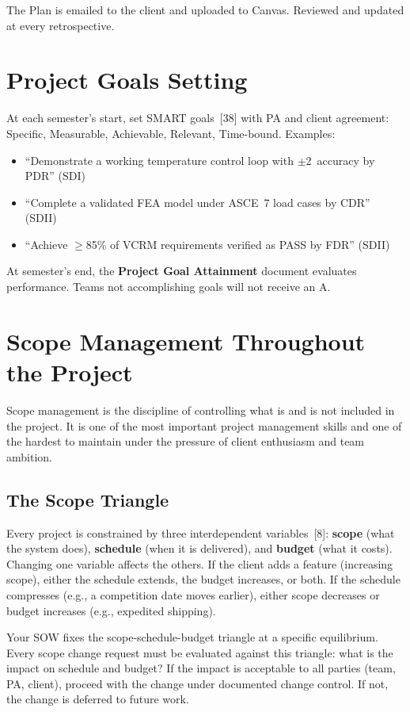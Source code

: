 The Plan is emailed to the client and uploaded to Canvas. Reviewed and updated at every retrospective.

\section{Project Goals Setting}
At each semester's start, set SMART goals~[38] with PA and client agreement: Specific, Measurable, Achievable, Relevant, Time-bound. Examples:
\begin{itemize}[nosep,leftmargin=1.5em]
\item ``Demonstrate a working temperature control loop with $\pm$2\,\degC{} accuracy by PDR'' (SDI)
\item ``Complete a validated FEA model under ASCE~7 load cases by CDR'' (SDII)
\item ``Achieve $\geq$85\% of VCRM requirements verified as PASS by FDR'' (SDII)
\end{itemize}

At semester's end, the \textbf{Project Goal Attainment} document evaluates performance. Teams not accomplishing goals will not receive an A.

\section{Scope Management Throughout the Project}
Scope management is the discipline of controlling what is and is not included in the project. It is one of the most important project management skills and one of the hardest to maintain under the pressure of client enthusiasm and team ambition.

\subsection{The Scope Triangle}
Every project is constrained by three interdependent variables~[8]: \textbf{scope} (what the system does), \textbf{schedule} (when it is delivered), and \textbf{budget} (what it costs). Changing one variable affects the others. If the client adds a feature (increasing scope), either the schedule extends, the budget increases, or both. If the schedule compresses (e.g., a competition date moves earlier), either scope decreases or budget increases (e.g., expedited shipping).

Your SOW fixes the scope-schedule-budget triangle at a specific equilibrium. Every scope change request must be evaluated against this triangle: what is the impact on schedule and budget? If the impact is acceptable to all parties (team, PA, client), proceed with the change under documented change control. If not, the change is deferred to future work.

